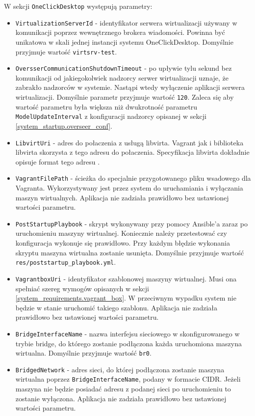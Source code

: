 \documentclass[../opis-rozwiazania.tex]{subfiles}
\begin{document}
W sekcji \texttt{OneClickDesktop} występują parametry:
\begin{itemize}
  \item \texttt{VirtualizationServerId} - identyfikator serwera wirtualizacji używany w komunikacji poprzez wewnętrznego brokera wiadomości. Powinna być unikatowa w skali jednej instancji systemu OneClickDesktop. Domyślnie przyjmuje wartość \texttt{virtsrv-test}.
  \item \texttt{OversserCommunicationShutdownTimeout} - po upływie tylu sekund bez komunikacji od jakiegokolwiek nadzorcy serwer wirtualizacji uznaje, że zabrakło nadzorców w systemie. Nastąpi wtedy wyłączenie aplikacji serwera wirtualizacji. Domyślnie parametr przyjmuje wartość \texttt{120}. Zaleca się aby wartość parametru była większa niż dwukrotność parametru \texttt{ModelUpdateInterval} z konfiguracji nadzorcy opisanej w sekcji \ref{system_startup.overseer_conf}.
  \item \texttt{LibvirtUri} - adres do połaczenia z usługą libvirta. Vagrant jak i biblioteka libvirta skorzysta z tego adresu do połaczenia. Specyfikacja libvirta dokładnie opisuje format tego adresu \parencite{libvirt-uri}.
  \item \texttt{VagrantFilePath} - ścieżka do specjalnie przygotowanego pliku wsadowego dla Vagranta. Wykorzystywany jest przez system do uruchamiania i wyłączania maszyn wirtualnych. Aplikacja nie zadziała prawidłowo bez ustawionej wartości parametru.
  \item \texttt{PostStartupPlaybook} - skrypt wykonywany przy pomocy Ansible'a zaraz po uruchomieniu maszyny wirtualnej. Koniecznie należy przetestować czy konfiguracja wykonuje się prawidłowo. Przy każdym błędzie wykonania skryptu maszyna wirtualna zostanie usunięta. Domyślnie przyjmuje wartość \texttt{res/poststartup\_playbook.yml}.
  \item \texttt{VagrantboxUri} - identyfikator szablonowej maszyny wirtualnej. Musi ona spełniać szereg wymogów opisanych w sekcji \ref{system_requirements.vagrant_box}. W przeciwnym wypadku system nie będzie w stanie uruchomić takiego szablonu. Aplikacja nie zadziała prawidłowo bez ustawionej wartości parametru.
  \item \texttt{BridgeInterfaceName} - nazwa interfejsu sieciowego w skonfigurowanego w trybie bridge, do którego zostanie podłączona każda uruchomiona maszyna wirtualna. Domyślnie przyjmuje wartość \texttt{br0}.
  \item \texttt{BridgedNetwork} - adres sieci, do której podłączona zostanie maszyna wirtualna poprzez \texttt{BridgeInterfaceName}, podany w formacie CIDR. Jeżeli maszyna nie będzie posiadać adresu z podanej sieci po uruchomieniu to zostanie wyłączona. Aplikacja nie zadziała prawidłowo bez ustawionej wartości parametru.

\end{itemize}
\end{document}
